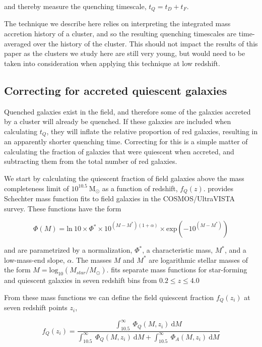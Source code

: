 and thereby measure the quenching timescale, $t_Q = t_D + t_F$.

The technique we describe here relies on interpreting the integrated mass accretion history of a cluster, and so the resulting quenching timescales are time-averaged over the history of the cluster.
This should not impact the results of this paper as the clusters we study here are still very young, but would need to be taken into consideration when applying this technique at low redshift.

\subsection{Correcting for accreted quiescent galaxies}\label{sec-a-field}

Quenched galaxies exist in the field, and therefore some of the galaxies accreted by a cluster will already be quenched.
If these galaxies are included when calculating $t_Q$, they will inflate the relative proportion of red galaxies, resulting in an apparently shorter quenching time.
Correcting for this is a simple matter of calculating the fraction of galaxies that were quiescent when accreted, and subtracting them from the total number of red galaxies.

We start by calculating the quiescent fraction of field galaxies above the mass completeness limit of $10^{10.5}~ \mathrm{M}_\odot$ as a function of redshift, $f_Q(z)$.
\citet{Muzzin:2013ab} provides Schechter mass function fits to field galaxies in the COSMOS/UltraVISTA survey.
These functions have the form

\begin{equation*}
\Phi(M) = \mathrm{ln}\ 10\times\Phi^*\times10^{(M-M^*)(1+\alpha)}\times \mathrm{exp}(-10^{(M-M^*)})
\end{equation*}

and are parametrized by a normalization, $\Phi^*$, a characteristic mass, $M^*$, and a low-mass-end slope, $\alpha$.
The masses $M$ and $M^*$ are logarithmic stellar masses of the form $M=\mathrm{log}_{10}(M_{star}/M_\odot)$.
\citet{Muzzin:2013ab} fits separate mass functions for star-forming and quiescent galaxies in seven redshift bins from $0.2 \leq z \leq 4.0$

From these mass functions we can define the field quiescent fraction $f_Q(z_i)$ at seven redshift points $z_i$,

\begin{equation*}
f_Q(z_i) = \frac{\int_{10.5}^{\infty}~\Phi_Q(M, z_i)~\mathrm{d}M}{\int_{10.5}^{\infty}~\Phi_Q(M, z_i)~\mathrm{d}M+\int_{10.5}^{\infty}~\Phi_A(M, z_i)~\mathrm{d}M}
\end{equation*}

